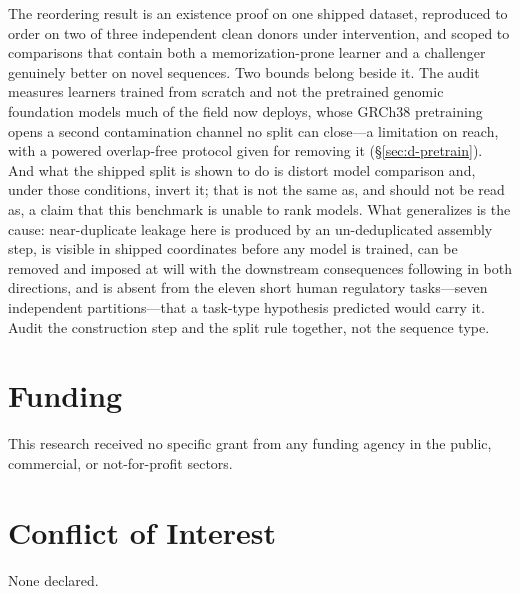 \documentclass[webpdf,modern,large,namedate]{oup-authoring-template}%
\begin{document}
The reordering result is an existence proof on one shipped dataset, reproduced to order on two of three independent clean donors under intervention, and scoped to comparisons that contain both a memorization-prone learner and a challenger genuinely better on novel sequences. Two bounds belong beside it. The audit measures learners trained from scratch and not the pretrained genomic foundation models much of the field now deploys, whose GRCh38 pretraining opens a second contamination channel no split can close---a limitation on reach, with a powered overlap-free protocol given for removing it (\S\ref{sec:d-pretrain}). And what the shipped split is shown to do is distort model comparison and, under those conditions, invert it; that is not the same as, and should not be read as, a claim that this benchmark is unable to rank models. What generalizes is the cause: near-duplicate leakage here is produced by an un-deduplicated assembly step, is visible in shipped coordinates before any model is trained, can be removed and imposed at will with the downstream consequences following in both directions, and is absent from the eleven short human regulatory tasks---seven independent partitions---that a task-type hypothesis predicted would carry it. Audit the construction step and the split rule together, not the sequence type.

\section*{Funding}
This research received no specific grant from any funding agency in the public, commercial, or not-for-profit sectors.

\section*{Conflict of Interest}
None declared.
\end{document}

